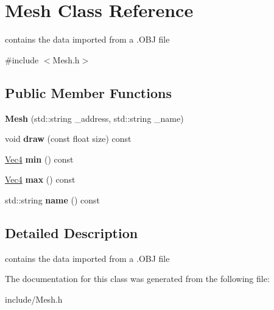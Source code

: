 \hypertarget{classMesh}{}\section{Mesh Class Reference}
\label{classMesh}


contains the data imported from a .O\+BJ file  




{\ttfamily \#include $<$Mesh.\+h$>$}

\subsection*{Public Member Functions}
\begin{DoxyCompactItemize}
\item 
{\bfseries Mesh} (std\+::string \+\_\+address, std\+::string \+\_\+name)\hypertarget{classMesh_aa7688f9ef625c97b5c4f3e36a2d7bd4c}{}\label{classMesh_aa7688f9ef625c97b5c4f3e36a2d7bd4c}

\item 
void {\bfseries draw} (const float size) const \hypertarget{classMesh_ab4d3c442a083456fd5113471bccba085}{}\label{classMesh_ab4d3c442a083456fd5113471bccba085}

\item 
\hyperlink{classVec4}{Vec4} {\bfseries min} () const \hypertarget{classMesh_a8828749f265dfbdcb7be849930450a52}{}\label{classMesh_a8828749f265dfbdcb7be849930450a52}

\item 
\hyperlink{classVec4}{Vec4} {\bfseries max} () const \hypertarget{classMesh_a208897a6d152345aba91770cd4c8886c}{}\label{classMesh_a208897a6d152345aba91770cd4c8886c}

\item 
std\+::string {\bfseries name} () const \hypertarget{classMesh_a3574d07900a4f7978bba3013d31586e3}{}\label{classMesh_a3574d07900a4f7978bba3013d31586e3}

\end{DoxyCompactItemize}


\subsection{Detailed Description}
contains the data imported from a .O\+BJ file 

The documentation for this class was generated from the following file\+:\begin{DoxyCompactItemize}
\item 
include/Mesh.\+h\end{DoxyCompactItemize}
